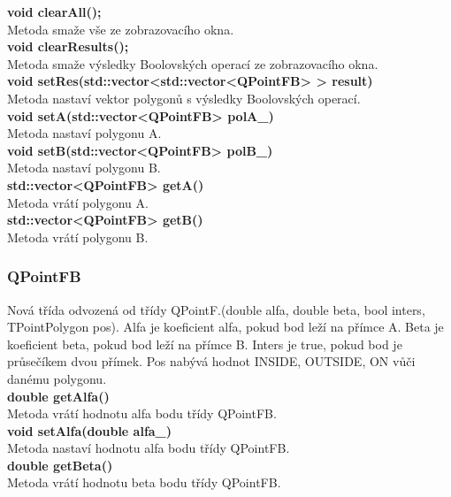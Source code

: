 \documentclass[a4paper, 12pt]{article}
\begin{document}
\textbf{void clearAll();}\\
Metoda smaže vše ze zobrazovacího okna.\\

\textbf{void clearResults();}\\
Metoda smaže výsledky Boolovských operací ze zobrazovacího okna.\\

\textbf{void setRes(std::vector<std::vector<QPointFB> > result)}\\
Metoda nastaví vektor polygonů s výsledky Boolovských operací.\\

\textbf{void setA(std::vector<QPointFB> polA_)}\\
Metoda nastaví polygonu A.\\

\textbf{void setB(std::vector<QPointFB> polB_)}\\
Metoda nastaví polygonu B.\\

\textbf{std::vector<QPointFB> getA()}\\
Metoda vrátí polygonu A.\\

\textbf{std::vector<QPointFB> getB()}\\
Metoda vrátí polygonu B.\\


\subsubsection{QPointFB}
Nová třída odvozená od třídy QPointF.(double alfa, double beta, bool inters, TPointPolygon pos). Alfa je koeficient alfa, pokud bod leží na přímce A. 
Beta je koeficient beta, pokud bod leží na přímce B. Inters je true, pokud bod je průsečíkem dvou přímek. Pos nabývá hodnot INSIDE, OUTSIDE, ON vůči danému polygonu.\\

\textbf{double getAlfa()}\\
Metoda vrátí hodnotu alfa bodu třídy QPointFB.\\

\textbf{void setAlfa(double alfa_)}\\
Metoda nastaví hodnotu alfa bodu třídy QPointFB.\\

\textbf{double getBeta()}\\
Metoda vrátí hodnotu beta bodu třídy QPointFB.\\
\end{document}
